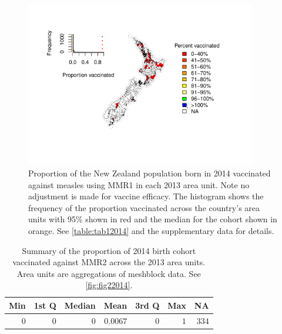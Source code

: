 \documentclass{article}
\begin{document}
\begin{figure}
\begin{center}
    \includegraphics[width=0.9\textwidth]{nir_census_MMR1_NIR_2014.pdf}
 \end{center}
    \caption{Proportion of the New Zealand population born in 2014 vaccinated against measles using MMR1 in each 2013 area unit. Note no adjustment is made for vaccine efficacy. The histogram shows the frequency of the proportion vaccinated across the country's area units with 95\% shown in red and the median for the cohort shown in orange. See \autoref{table:tab12014} and the supplementary data for details.}
\label{fig:fig12014}
\end{figure}

 \vspace{5mm} %
\begin{table}
\begin{center}
\begin{tabular}{rrrrrrr}
\hline\hline
\multicolumn{1}{c}{Min}&\multicolumn{1}{c}{1st Q}&\multicolumn{1}{c}{Median}&\multicolumn{1}{c}{Mean}&\multicolumn{1}{c}{3rd Q}&\multicolumn{1}{c}{Max}&\multicolumn{1}{c}{NA}\tabularnewline
\hline
$0$&$0$&$0$&$0.0067$&$0$&$1$&$334$\tabularnewline
\hline
\end{tabular}\end{center}\caption{Summary of the proportion of 2014 birth cohort vaccinated against MMR2 across the 2013 area units. Area units are aggregations of meshblock data. See \autoref{fig:fig22014}.}
\label{table:tab22014}
\end{table}
\end{document}
